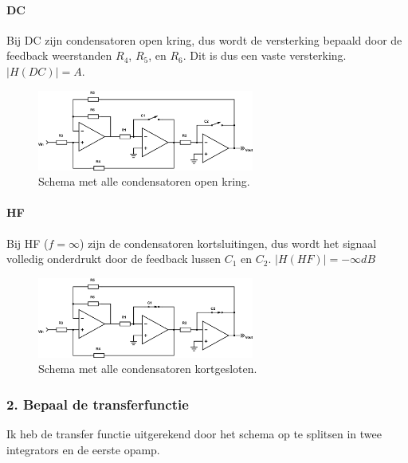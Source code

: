 \documentclass[a4paper,]{article}
\let\oldparagraph\paragraph
\renewcommand{\paragraph}[1]{\oldparagraph{#1}\mbox{}}
\begin{document}
\hypertarget{dc}{%
\paragraph{DC}\label{dc}}

Bij DC zijn condensatoren open kring, dus wordt de versterking bepaald
door de feedback weerstanden \(R_4\), \(R_5\), en \(R_6\). Dit is dus
een vaste versterking. \(|H(DC)| = A\).

\begin{figure}
\centering
\includegraphics[width=\textwidth,height=1.04167in]{assets/AF_05_LP_KHNni_DC.png}
\caption{Schema met alle condensatoren open kring.}
\end{figure}

\hypertarget{hf}{%
\paragraph{HF}\label{hf}}

Bij HF (\(f=\infty\)) zijn de condensatoren kortsluitingen, dus wordt
het signaal volledig onderdrukt door de feedback lussen \(C_1\) en
\(C_2\). \(|H(HF)| = -\infty dB\)

\begin{figure}
\centering
\includegraphics[width=\textwidth,height=1.04167in]{assets/AF_05_LP_KHNni_HF.png}
\caption{Schema met alle condensatoren kortgesloten.}
\end{figure}

\hypertarget{bepaal-de-transferfunctie}{%
\subsubsection{2. Bepaal de
transferfunctie}\label{bepaal-de-transferfunctie}}

Ik heb de transfer functie uitgerekend door het schema op te splitsen in
twee integrators en de eerste opamp.
\end{document}
